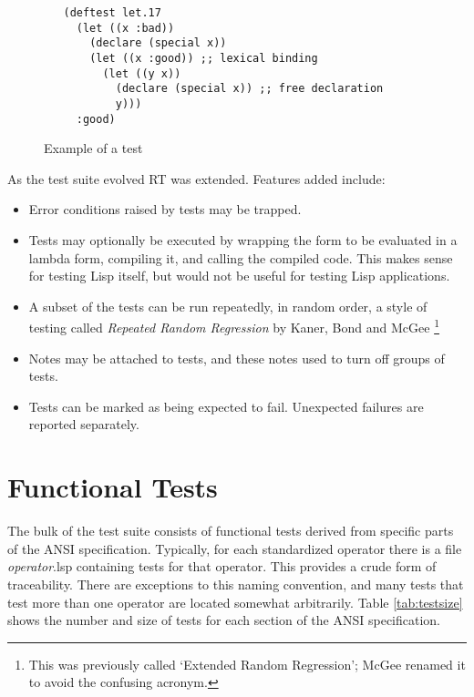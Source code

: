 \documentclass[11pt]{article}
\begin{document}
\begin{figure}
\begin{verbatim}
   (deftest let.17
     (let ((x :bad))
       (declare (special x))
       (let ((x :good)) ;; lexical binding
         (let ((y x))
           (declare (special x)) ;; free declaration
           y)))
     :good)
\end{verbatim}
\caption{\label{examplefig} Example of a test}
\end{figure}

As the test suite evolved RT was extended.  Features added include:
\begin{itemize}
   \item Error conditions raised by tests may be trapped.
   \item Tests may optionally be executed by wrapping the form to be
evaluated in a lambda form, compiling it, and calling the compiled
code.  This makes sense for testing Lisp itself, but would not be
useful for testing Lisp applications.
   \item A subset of the tests can be run repeatedly, in random order, a
style of testing called \emph{Repeated Random Regression} by Kaner,
Bond and McGee \cite{KanerBondMcGee:04}\footnote{This was previously
called `Extended Random Regression'; McGee renamed it to avoid the
confusing acronym.}
   \item Notes may be attached to tests, and these notes used to turn off
groups of tests.

\item Tests can be marked as being expected to fail.  Unexpected
      failures are reported separately.
\end{itemize}

\section {Functional Tests}

The bulk of the test suite consists of functional tests derived from
specific parts of the ANSI specification.  Typically, for each
standardized operator there is a file \emph{operator}.lsp containing
tests for that operator.  This provides a crude form of traceability.
There are exceptions to this naming convention, and many tests that
test more than one operator are located somewhat arbitrarily.
Table \ref{tab:testsize} shows the number and size of tests for each
section of the ANSI specification.
\end{document}
